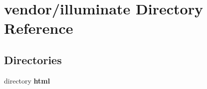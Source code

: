\section{vendor/illuminate Directory Reference}
\label{dir_c928de6b8009af2d25392162762da650}
\subsection*{Directories}
\begin{DoxyCompactItemize}
\item 
directory {\bf html}
\end{DoxyCompactItemize}
